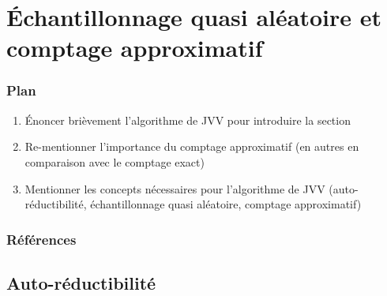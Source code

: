 \chapter{Échantillonnage quasi aléatoire et comptage approximatif}

\subsection*{Plan}

\begin{enumerate}
    \item Énoncer brièvement l'algorithme de JVV pour introduire la section
    \item Re-mentionner l'importance du comptage approximatif (en autres en comparaison avec le comptage exact)
    \item Mentionner les concepts nécessaires pour l'algorithme de JVV (auto-réductibilité, échantillonnage quasi aléatoire, comptage approximatif)
\end{enumerate}
\subsection*{Références}


\section{Auto-réductibilité}
 

